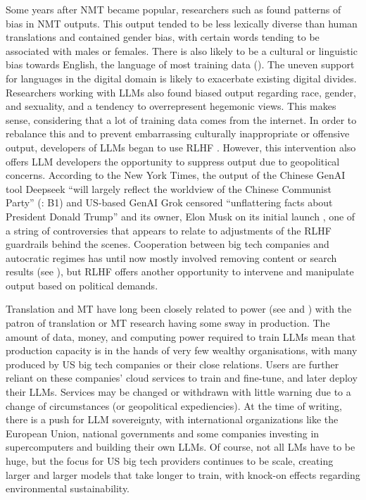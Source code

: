 \documentclass[output=paper]{langscibook}
\begin{document}
Some years after NMT became popular, researchers such as \citet{vanmassenhovehw18} found patterns of bias in NMT outputs. This output tended to be less lexically diverse than human translations and contained gender bias, with certain words tending to be associated with males or females. There is also likely to be a cultural or linguistic bias towards English, the language of most training data (\citealt{Bender2011, moorkens_automating_2025}). The uneven support for languages in the digital domain is likely to exacerbate existing digital divides. Researchers working with LLMs also found biased output regarding race, gender, and sexuality, and a tendency to overrepresent hegemonic views. This makes sense, considering that a lot of training data comes from the internet. In order to rebalance this and to prevent embarrassing culturally inappropriate or offensive output, developers of LLMs began to use RLHF \citep{ouyang2022rlhf}. However, this intervention also offers LLM developers the opportunity to suppress output due to geopolitical concerns. According to the New York Times, the output of the Chinese GenAI tool Deepseek “will largely reflect the worldview of the Chinese Communist Party” (\citealt{myers_propaganda_2025}: B1) and US-based GenAI Grok censored “unflattering facts about President Donald Trump” and its owner, Elon Musk on its initial launch \citep{wiggers_grok_2025}, one of a string of controversies that appears to relate to adjustments of the RLHF guardrails behind the scenes. Cooperation between big tech companies and autocratic regimes has until now mostly involved removing content or search results (see \citealt{boyle_revealed_2025}), but RLHF offers another opportunity to intervene and manipulate output based on political demands.

Translation and MT have long been closely related to power (see \citealt{tymoczko2007} and \citealt{paullada_how_2020}) with the patron of translation or MT research having some sway in production. The amount of data, money, and computing power required to train LLMs mean that production capacity is in the hands of very few wealthy organisations, with many produced by US big tech companies or their close relations. Users are further reliant on these companies' cloud services to train and fine-tune, and later deploy their LLMs. Services may be changed or withdrawn with little warning due to a change of circumstances (or geopolitical expediencies). At the time of writing, there is a push for LLM sovereignty, with international organizations like the European Union, national governments and some companies investing in supercomputers and building their own LLMs. Of course, not all LMs have to be huge, but the focus for US big tech providers continues to be scale, creating larger and larger models that take longer to train, with knock-on effects regarding environmental sustainability.
\end{document}
